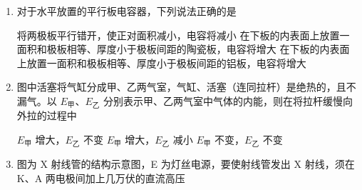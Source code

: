 \documentclass[\gkver]{gaokaozhenti}
\begin{document}
\begin{enumerate}
{$E_{k2} < E_{k1}$，$T_{2} > T_{1}$}
{$E_{k2} > E_{k1}$，$T_{2} < T_{1}$}
{$E_{k2} > E_{k1}$，$T_{2} > T_{1}$}


\item
对于水平放置的平行板电容器，下列说法正确的是 

{将两极板平行错开，使正对面积减小，电容将减小}
{在下板的内表面上放置一面积和极板相等、厚度小于极板间距的陶瓷板，电容将增大}
{在下板的内表面上放置一面积和极板相等、厚度小于极板间距的铝板，电容将增大}


\item
图中活塞将气缸分成甲、乙两气室，气缸、活塞（连同拉杆）是绝热的，且不漏气。以 $E_{\text{甲}}$、$E_{\text{乙}}$ 分别表示甲、乙两气室中气体的内能，则在将拉杆缓慢向外拉的过程中 

{$E_{\text{甲}}$ 增大，$E_{\text{乙}}$ 不变}
{$E_{\text{甲}}$ 增大，$E_{\text{乙}}$ 减小}
{$E_{\text{甲}}$ 不变，$E_{\text{乙}}$ 不变}


\item
图为 X 射线管的结构示意图，E 为灯丝电源，要使射线管发出 X 射线，须在 K、A 两电极间加上几万伏的直流高压 


\end{enumerate}
\end{document}

